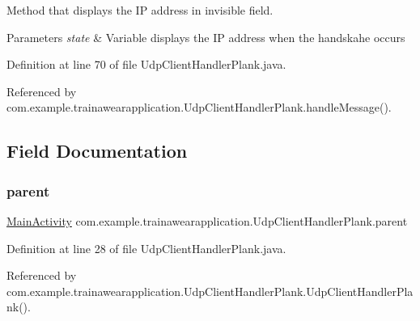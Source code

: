Method that displays the IP address in invisible field. 


\begin{DoxyParams}{Parameters}
{\em state} & Variable displays the IP address when the handskahe occurs \\
\hline
\end{DoxyParams}


Definition at line 70 of file Udp\+Client\+Handler\+Plank.\+java.


\begin{DoxyCode}{0}

\end{DoxyCode}


Referenced by com.\+example.\+trainawearapplication.\+Udp\+Client\+Handler\+Plank.\+handle\+Message().



\subsection{Field Documentation}
\mbox{\label{classcom_1_1example_1_1trainawearapplication_1_1_udp_client_handler_plank_a4ae127059889ca5270670220bb58b613}} 
\subsubsection{\texorpdfstring{parent}{parent}}
{\footnotesize\ttfamily \mbox{\hyperlink{classcom_1_1example_1_1trainawearapplication_1_1_main_activity}{Main\+Activity}} com.\+example.\+trainawearapplication.\+Udp\+Client\+Handler\+Plank.\+parent\hspace{0.3cm}{\ttfamily [private]}}



Definition at line 28 of file Udp\+Client\+Handler\+Plank.\+java.



Referenced by com.\+example.\+trainawearapplication.\+Udp\+Client\+Handler\+Plank.\+Udp\+Client\+Handler\+Plank().

